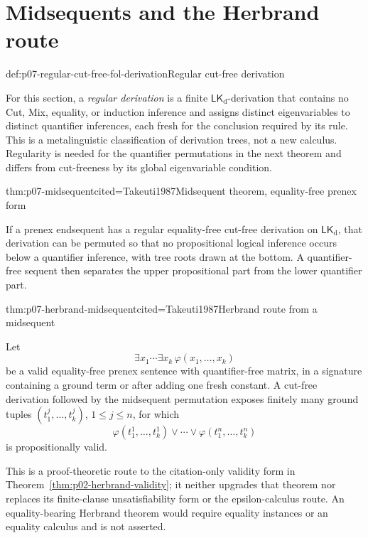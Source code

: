 \section{Midsequents and the Herbrand route}

\begin{hbdefinition}{def:p07-regular-cut-free-fol-derivation}{Regular cut-free derivation}
\par\noindent
For this section, a \emph{regular derivation} is a
finite \(\mathsf{LK}_{\mathrm d}\)-derivation that contains no Cut, Mix,
equality, or induction inference and assigns distinct eigenvariables to
distinct quantifier inferences, each fresh for the conclusion required by its
rule.  This is a metalinguistic classification of derivation trees, not a new
calculus.  Regularity is needed for the quantifier permutations in the next
theorem and differs from cut-freeness by its global eigenvariable condition.
\end{hbdefinition}

\begin{hbtheorem}{thm:p07-midsequent}{cited=Takeuti1987}{Midsequent theorem, equality-free prenex form}
\par\noindent
If a prenex endsequent has a regular equality-free cut-free derivation on
\(\mathsf{LK}_{\mathrm d}\), that derivation can be permuted so that no
propositional logical inference occurs below a quantifier inference, with
tree roots drawn at the bottom.  A quantifier-free sequent then separates the
upper propositional part from the lower quantifier part.
\end{hbtheorem}

\begin{hbtheorem}{thm:p07-herbrand-midsequent}{cited=Takeuti1987}{Herbrand route from a midsequent}
\par\noindent
Let
\[
 \exists x_1\cdots\exists x_k\,\varphi(x_1,\ldots,x_k)
\]
be a valid equality-free prenex sentence with quantifier-free matrix, in a
signature containing a ground term or after adding one fresh constant.  A cut-free
derivation followed by the midsequent permutation exposes finitely many
ground tuples \((t_1^j,\ldots,t_k^j)\), \(1\leq j\leq n\), for which
\[
 \varphi(t_1^1,\ldots,t_k^1)\lor\cdots\lor
 \varphi(t_1^n,\ldots,t_k^n)
\]
is propositionally valid.
\end{hbtheorem}

This is a proof-theoretic route to the citation-only validity form in
Theorem~\ref{thm:p02-herbrand-validity}; it neither upgrades that theorem nor
replaces its finite-clause unsatisfiability form or the epsilon-calculus
route.  An equality-bearing Herbrand theorem would require equality instances
or an equality calculus and is not asserted.

